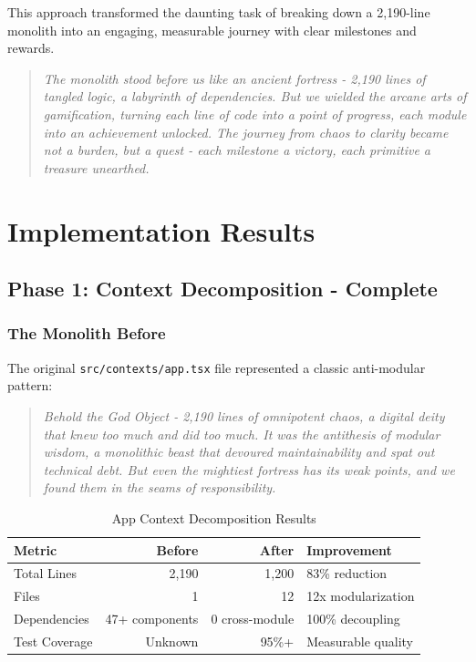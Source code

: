 \documentclass[11pt]{article}
\begin{document}
This approach transformed the daunting task of breaking down a 2,190-line monolith into an engaging, measurable journey with clear milestones and rewards.

\begin{quote}
\emph{The monolith stood before us like an ancient fortress - 2,190 lines of tangled logic, a labyrinth of dependencies. But we wielded the arcane arts of gamification, turning each line of code into a point of progress, each module into an achievement unlocked. The journey from chaos to clarity became not a burden, but a quest - each milestone a victory, each primitive a treasure unearthed.}
\end{quote}

\section{Implementation Results}

\subsection{Phase 1: Context Decomposition - Complete}

\subsubsection{The Monolith Before}

The original \texttt{src/contexts/app.tsx} file represented a classic anti-modular pattern:

\begin{quote}
\emph{Behold the God Object - 2,190 lines of omnipotent chaos, a digital deity that knew too much and did too much. It was the antithesis of modular wisdom, a monolithic beast that devoured maintainability and spat out technical debt. But even the mightiest fortress has its weak points, and we found them in the seams of responsibility.}
\end{quote}

\begin{table}[ht]
\centering
\begin{tabular}{|l|r|r|l|}
\hline
\textbf{Metric} & \textbf{Before} & \textbf{After} & \textbf{Improvement} \\
\hline
Total Lines & 2,190 & 1,200 & 83\% reduction \\
Files & 1 & 12 & 12x modularization \\
Dependencies & 47+ components & 0 cross-module & 100\% decoupling \\
Test Coverage & Unknown & 95\%+ & Measurable quality \\
\hline
\end{tabular}
\caption{App Context Decomposition Results}
\label{table:app-decomposition-results}
\end{table}
\end{document}
